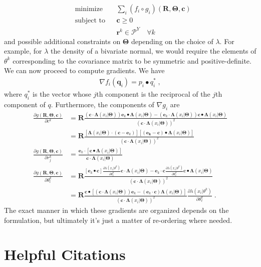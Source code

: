 \documentclass[english]{scrartcl}
\begin{document}
\begin{equation*}
	\begin{aligned}
		& \text{minimize} 
		& & \sum_i (f_i \circ g_i)(\mathbf{R}, \mathbf{\Theta}, \mathbf{c})   \\
		& \text{subject to} 
		& & \mathbf{c} \geq 0 \\
		& & & \mathbf{r}^k \in \mathcal{P}^Y \quad \forall k 
	\end{aligned}
	\end{equation*}
and possible additional constraints on $\mathbf{\Theta}$ depending on the choice of $\lambda$. For example, for $\lambda$ the density of a bivariate normal, we would require the elements of $\theta^k$ corresponding to the covariance matrix to be symmetric and positive-definite. 
We can now proceed to compute gradients. We have 
\begin{align*}
	\nabla f_i (\mathbf{q}_i) = p_i \bullet q_i^{*}\;,
\end{align*}
where $q_i^{*}$ is the vector whose $j$th component is the reciprocal of the $j$th component of $q$. Furthermore, the components of $\nabla g_i$ are
\begin{align}
	\frac{\partial g(\mathbf{R}, \mathbf{\Theta}, \mathbf{c})}{\partial c^k} &= \mathbf{R}\frac{(\mathbf{c} \cdot \mathbf{\Lambda}(x_i|\mathbf{\Theta}))\mathbf{e}_k \bullet \mathbf{\Lambda}(x_i|\mathbf{\Theta}) - (\mathbf{e}_k \cdot \mathbf{\Lambda}(x_i|\mathbf{\Theta})) \mathbf{c} \bullet \mathbf{\Lambda}(x_i|\mathbf{\Theta})}{(\mathbf{c} \cdot \mathbf{\Lambda}(x_i|\mathbf{\Theta}))^2} \\
	&= \mathbf{R}\frac{\left[\mathbf{\Lambda}(x_i|\mathbf{\Theta}) \cdot (\mathbf{c} - \mathbf{e}_k)\right]   \left[(\mathbf{e_k - \mathbf{c}}) \bullet \mathbf{\Lambda}(x_i|\mathbf{\Theta})\right]}{(\mathbf{c} \cdot \mathbf{\Lambda}(x_i|\mathbf{\Theta}))^2} \\
	\frac{\partial g(\mathbf{R}, \mathbf{\Theta}, \mathbf{c})}{\partial r^k_j} &=  \frac{ \mathbf{e}_k \cdot [\mathbf{c} \bullet \mathbf{\Lambda}(x_i|\mathbf{\Theta})] }{\mathbf{c} \cdot \mathbf{\Lambda}(x_i|\mathbf{\Theta})} \\
	\frac{\partial g(\mathbf{R}, \mathbf{\Theta}, \mathbf{c})}{\partial \theta^k_l} &= \mathbf{R} \frac{[\mathbf{e}_k \bullet \mathbf{c}] \frac{\partial \lambda(x_i|\theta^k)}{ \partial \theta^k_\ell}\mathbf{c} \cdot \mathbf{\Lambda}(x_i|\mathbf{\Theta}) - \mathbf{e}_k \cdot \mathbf{c} \frac{\partial \lambda(x_i |\theta^k)}{\partial \theta^k_\ell} \mathbf{c} \bullet \mathbf{\Lambda}(x_i|\mathbf{\Theta})}{(\mathbf{c} \cdot \mathbf{\Lambda}(x_i|\mathbf{\Theta}))^2} \\
	&= \mathbf{R} \frac{\mathbf{c} \bullet \left[ (\mathbf{c} \cdot \mathbf{\Lambda}(x_i|\mathbf{\Theta})) \mathbf{e}_k - (\mathbf{e}_k \cdot \mathbf{c})\mathbf{\Lambda}(x_i|\mathbf{\Theta}) \right]}{(\mathbf{c} \cdot \mathbf{\Lambda}(x_i|\mathbf{\Theta}))^2} \frac{\partial \lambda(x_i|\theta^k)}{ \partial \theta^k_\ell}\;.
\end{align}
The exact manner in which these gradients are organized depends on the formulation, but ultimately it's just a matter of re-ordering where needed. 




\section{Helpful Citations}
\end{document}
